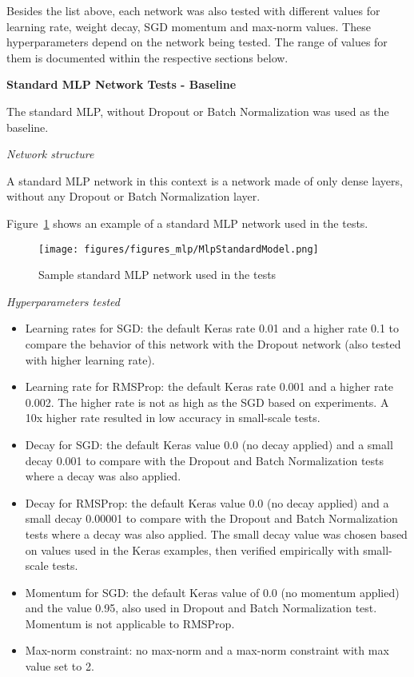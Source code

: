 \documentclass[../CAP6619_term_project_cgarbin.tex]{subfiles}
\begin{document}
Besides the list above, each network was also tested with different values for learning rate, weight decay, SGD momentum and max-norm values. These hyperparameters depend on the network being tested. The range of values for them is documented within the respective sections below.


\medskip
\textbf{Standard MLP Network Tests - Baseline}

The standard MLP, without Dropout or Batch Normalization was used as the baseline.

\smallskip
\textit{Network structure}

A standard MLP network in this context is a network made of only dense layers, without any Dropout or Batch Normalization layer. 

Figure~\ref{fig:MlpStandardModel} shows an example of a standard MLP network used in the tests.

\begin{figure}[htbp]
\centerline{\texttt{[image: figures/figures\_mlp/MlpStandardModel.png]}}
\caption{Sample standard MLP network used in the tests}
\label{fig:MlpStandardModel}
\end{figure}

\medskip
\textit{Hyperparameters tested}

\begin{itemize}
\item Learning rates for SGD: the default Keras rate 0.01 and a higher rate 0.1 to compare the behavior of this network with the Dropout network (also tested with higher learning rate).
\item Learning rate for RMSProp: the default Keras rate 0.001 and a higher rate 0.002. The higher rate is not as high as the SGD based on experiments. A 10x higher rate resulted in low accuracy in small-scale tests.
\item Decay for SGD: the default Keras value 0.0 (no decay applied) and a small decay 0.001 to compare with the Dropout and Batch Normalization tests where a decay was also applied.
\item Decay for RMSProp: the default Keras value 0.0 (no decay applied) and a small decay 0.00001 to compare with the Dropout and Batch Normalization tests where a decay was also applied. The small decay value was chosen based on values used in the Keras examples, then verified empirically with small-scale tests.
\item Momentum for SGD: the default Keras value of 0.0 (no momentum applied) and the value 0.95, also used in Dropout and Batch Normalization test. Momentum is not applicable to RMSProp.
\item Max-norm constraint: no max-norm and a max-norm constraint with max value set to 2.
\end{itemize}
\end{document}
